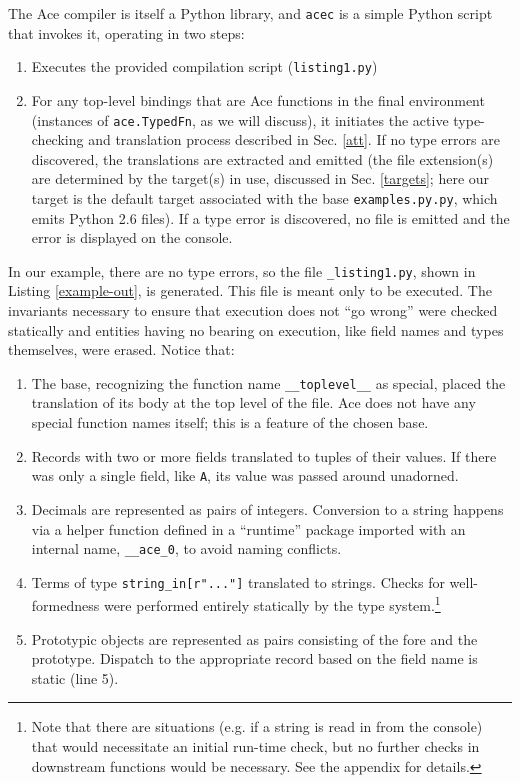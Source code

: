 \documentclass[10pt,preprint]{sigplanconf}
\begin{document}
{The Ace compiler is itself a Python library, and \verb|acec| is a simple Python script that invokes it, operating in two steps:
\begin{enumerate}
\item Executes the provided compilation script (\verb|listing1.py|)
\item For any top-level bindings that are Ace functions in the final environment (instances of \verb|ace.TypedFn|, as we will discuss), it initiates the active type-checking and translation process described in Sec. \ref{att}. If no type errors are discovered, the translations are extracted and emitted (the file extension(s) are determined by the target(s) in use, discussed in Sec. \ref{targets}; here our target is  the default target associated with the base \verb|examples.py.py|, which emits Python 2.6 files). If a type error is discovered, no file is emitted and the error is displayed on the console.
\end{enumerate}

In our example, there are no type errors, so the file \verb|_listing1.py|, shown in Listing \ref{example-out},  is generated. This file is meant only to be executed. The invariants necessary to ensure that execution does not ``go wrong'' were checked statically and entities having no bearing on execution, like field names and types themselves, were erased. Notice that:
\begin{enumerate}
\item The base, recognizing the function name \verb|__toplevel__| as special, placed the translation of its body  at the top level of the file. Ace does not have any special function names itself; this is a feature of the chosen base.
\item Records with two or more fields translated to tuples of their values. If there was only a single field, like \verb|A|, its value was passed around unadorned. 
\item Decimals are represented as pairs of integers. Conversion to a string happens via a helper function defined in a ``runtime'' package imported with an internal name, \verb|__ace_0|, to avoid naming conflicts. 
\item Terms of type \verb|string_in[r"..."]| translated to strings. Checks for well-formedness were performed entirely statically by the type system.\footnote{Note that there are situations (e.g. if a string is read in from the console) that would necessitate an initial run-time check, but no further checks in downstream functions would be necessary. See the appendix for details.}
\item Prototypic objects are represented as pairs consisting of the fore and the prototype. Dispatch to the appropriate record based on the field name is static (line 5).
\end{enumerate}

}
\end{document}
